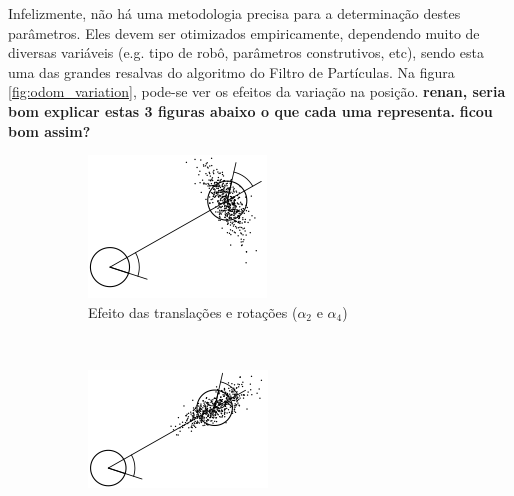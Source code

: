\documentclass[
	12pt,				%
	openright,			%
	oneside,			%
	a4paper,			%
	english,			%
	french,				%
	spanish,			%
	brazil,				%
	]{abntex2}
\begin{document}
Infelizmente, não há uma metodologia precisa para a determinação destes parâmetros. Eles devem ser otimizados empiricamente, dependendo muito de diversas variáveis (e.g. tipo de robô, parâmetros construtivos, etc), sendo esta uma das grandes resalvas do algoritmo do Filtro de Partículas. Na figura \ref{fig:odom_variation}, pode-se ver os efeitos da variação na posição. \textbf{renan, seria bom explicar estas 3 figuras abaixo o que cada uma representa.} \textbf{ficou bom assim?}

\begin{figure}[h!]
    \centering
    \begin{subfigure}[b]{0.25\textwidth}
        \includegraphics[width=\textwidth]{figs/odom_variation_1}
        \caption{Efeito das translações e rotações ($\alpha_2$ e $\alpha_4$)}
        \label{fig:odom_variation_1}
    \end{subfigure}
    ~ %
    \begin{subfigure}[b]{0.25\textwidth}
        \includegraphics[width=\textwidth]{figs/odom_variation_2}

\end{subfigure}
\end{figure}
\end{document}
